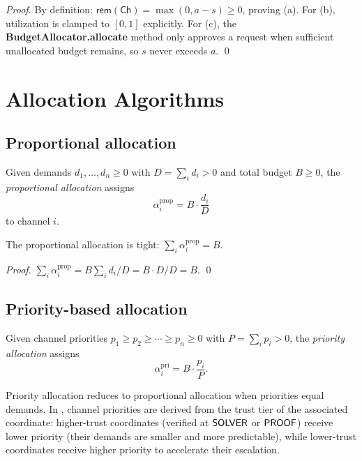 \documentclass[11pt]{article}
\providecommand{\Chan}{\mathsf{Ch}}            %
\providecommand{\Alloc}{\alpha}                %
\providecommand{\Rem}{\mathsf{rem}}            %
\begin{document}
\begin{proof}
By definition: $\Rem(\Chan) = \max(0, a - s) \ge 0$, proving (a).
For (b), utilization is clamped to $[0, 1]$ explicitly.
For (c), the \textbf{BudgetAllocator.allocate} method only approves
a request when sufficient unallocated budget remains, so $s$ never
exceeds $a$. \qed
\end{proof}

\section{Allocation Algorithms}\label{sec:algorithms}

\subsection{Proportional allocation}

\begin{definition}\label{def:proportional}
Given demands $d_1, \ldots, d_n \ge 0$ with
$D = \sum_i d_i > 0$ and total budget $B \ge 0$, the
\emph{proportional allocation} assigns
\[
  \Alloc_i^{\mathrm{prop}} = B \cdot \frac{d_i}{D}
\]
to channel $i$.
\end{definition}

\begin{lemma}\label{lem:prop-tight}
The proportional allocation is tight: $\sum_i \Alloc_i^{\mathrm{prop}} = B$.
\end{lemma}

\begin{proof}
$\sum_i \Alloc_i^{\mathrm{prop}} = B \sum_i d_i / D = B \cdot D / D = B$. \qed
\end{proof}

\subsection{Priority-based allocation}

\begin{definition}\label{def:priority}
Given channel priorities $p_1 \ge p_2 \ge \cdots \ge p_n \ge 0$
with $P = \sum_i p_i > 0$, the \emph{priority allocation} assigns
\[
  \Alloc_i^{\mathrm{pri}} = B \cdot \frac{p_i}{P}.
\]
\end{definition}

Priority allocation reduces to proportional allocation when priorities
equal demands.  In \JuGeo{}, channel priorities are derived from the
trust tier of the associated coordinate: higher-trust coordinates
(verified at $\mathsf{SOLVER}$ or $\mathsf{PROOF}$) receive lower priority (their
demands are smaller and more predictable), while lower-trust
coordinates receive higher priority to accelerate their escalation.
\end{document}

